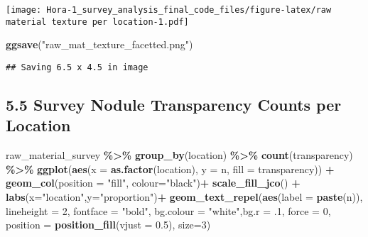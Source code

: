 \documentclass[
]{article}
\newenvironment{Shaded}{\begin{snugshade}}{\end{snugshade}}
\newcommand{\AttributeTok}[1]{\textcolor[rgb]{0.13,0.29,0.53}{#1}}
\newcommand{\DecValTok}[1]{\textcolor[rgb]{0.00,0.00,0.81}{#1}}
\newcommand{\FloatTok}[1]{\textcolor[rgb]{0.00,0.00,0.81}{#1}}
\newcommand{\FunctionTok}[1]{\textcolor[rgb]{0.13,0.29,0.53}{\textbf{#1}}}
\newcommand{\NormalTok}[1]{#1}
\newcommand{\SpecialCharTok}[1]{\textcolor[rgb]{0.81,0.36,0.00}{\textbf{#1}}}
\newcommand{\StringTok}[1]{\textcolor[rgb]{0.31,0.60,0.02}{#1}}
\begin{document}
\texttt{[image: Hora-1\_survey\_analysis\_final\_code\_files/figure-latex/raw material texture per location-1.pdf]}

\begin{Shaded}
\begin{Highlighting}[]
\FunctionTok{ggsave}\NormalTok{(}\StringTok{"raw\_mat\_texture\_facetted.png"}\NormalTok{)}
\end{Highlighting}
\end{Shaded}

\begin{verbatim}
## Saving 6.5 x 4.5 in image
\end{verbatim}

\hypertarget{survey-nodule-transparency-counts-per-location}{%
\subsection{5.5 Survey Nodule Transparency Counts per
Location}\label{survey-nodule-transparency-counts-per-location}}

\begin{Shaded}
\begin{Highlighting}[]
\NormalTok{raw\_material\_survey }\SpecialCharTok{\%\textgreater{}\%}
  \FunctionTok{group\_by}\NormalTok{(location) }\SpecialCharTok{\%\textgreater{}\%}
  \FunctionTok{count}\NormalTok{(transparency) }\SpecialCharTok{\%\textgreater{}\%}
  \FunctionTok{ggplot}\NormalTok{(}\FunctionTok{aes}\NormalTok{(}\AttributeTok{x =} \FunctionTok{as.factor}\NormalTok{(location), }\AttributeTok{y =}\NormalTok{ n, }\AttributeTok{fill =}\NormalTok{ transparency)) }\SpecialCharTok{+}
  \FunctionTok{geom\_col}\NormalTok{(}\AttributeTok{position =} \StringTok{"fill"}\NormalTok{, }\AttributeTok{colour=}\StringTok{"black"}\NormalTok{)}\SpecialCharTok{+}
  \FunctionTok{scale\_fill\_jco}\NormalTok{() }\SpecialCharTok{+}
  \FunctionTok{labs}\NormalTok{(}\AttributeTok{x=}\StringTok{"location"}\NormalTok{,}\AttributeTok{y=}\StringTok{"proportion"}\NormalTok{)}\SpecialCharTok{+}
  \FunctionTok{geom\_text\_repel}\NormalTok{(}\FunctionTok{aes}\NormalTok{(}\AttributeTok{label =} \FunctionTok{paste}\NormalTok{(n)), }
                \AttributeTok{lineheight =} \DecValTok{2}\NormalTok{,}
            \AttributeTok{fontface =} \StringTok{"bold"}\NormalTok{, }\AttributeTok{bg.colour =} \StringTok{"white"}\NormalTok{,}\AttributeTok{bg.r =}\NormalTok{ .}\DecValTok{1}\NormalTok{, }\AttributeTok{force =} \DecValTok{0}\NormalTok{,}
                \AttributeTok{position =} \FunctionTok{position\_fill}\NormalTok{(}\AttributeTok{vjust =} \FloatTok{0.5}\NormalTok{), }\AttributeTok{size=}\DecValTok{3}\NormalTok{)}
\end{Highlighting}
\end{Shaded}
\end{document}
